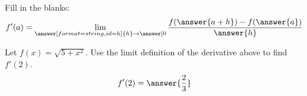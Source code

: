 \documentclass{ximera}
\begin{document}
\begin{exercise}

Fill in the blanks:
  \[
  f'(a)=\lim_{\answer[format=string,id=h]{h}\to\answer[{0}}\frac{f(\answer{a+h})-f(\answer{a})}{\answer{h}}
  \]
    
    

  \begin{exercise}
    Let $f(x)=\sqrt{5+x^2}$. Use the limit definition of the derivative
    above to find $f'(2)$.
    \[
    f'(2)=\answer{\frac{2}{3}}
    \]
  \end{exercise}
\end{exercise}
\end{document}
